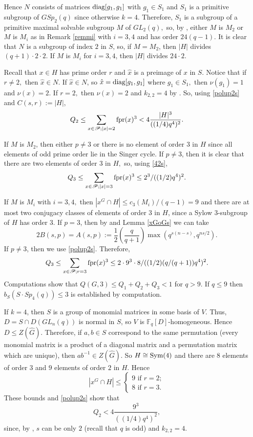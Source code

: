 Hence $N$ consists of matrices $\mathrm{diag}[g_1,g_1]$ with $g_1 \in S_1$ and $S_1$ is a primitive subgroup of $GSp_2(q)$ since otherwise $k=4.$ Therefore, $S_1$ is a subgroup of a primitive maximal solvable subgroup $M$ of $GL_2(q),$ so, by \cite[Chapter 5]{short}, either $M$ is $M_2$ or $M$ is  $M_i$ as in Remark \ref{remmi} with $i=3,4$  and has order $24(q-1).$ It is clear that $N$ is a subgroup of index $2$ in $S$, so, if $M=M_2$, then  $|H|$ divides $(q+1) \cdot 2 \cdot 2$. If $M$ is $M_i$ for $i=3,4$, then $|H|$ divides $24 \cdot 2$.

 Recall that $x \in H$ has prime order $r$ and $\hat{x}$ is a preimage of $x$ in $S$. Notice that if $r\ne 2,$ then $\hat{x} \in N.$ If $\hat{x} \in N$, so $\hat{x}=\mathrm{diag}[g_1,g_1]$ where $g_1 \in S_1,$ then $\nu(g_1)=1$ and $\nu(x)=2.$  If $r=2,$ then $\nu(x)=2$ and $k_{2,2}=4$ by \cite[Table 3.8]{fpr2}. 
So, using \eqref{polup2s} and $C(s,r) := |H|$,%
$$
Q_2  \le \sum_{{x} \in \mathscr{P}; |x|=2}{\mathrm{fpr}}({x})^3
<   4\frac{|H|^3}{((1/4)q^4)^2}. 
$$


If $M$ is $M_2$, then either $p\ne 3$ or there is no element of order $3$ in $H$ since all elements of odd prime order lie in the Singer cycle. If $p \ne 3$, then it is clear that there are two elements of order $3$ in $H,$ so, using \eqref{42s},%
 $$Q_{3}  \le \sum_{{x} \in \mathscr{P}; |x|=3}{\mathrm{fpr}}({x})^3  \le 2^3/((1/2)q^4)^2.$$

If $M$ is $M_i$ with $i=3,4,$ then $|x^G \cap H|\le c_3(M_i)/(q-1)=9$ and there are at most two conjugacy classes of elements of order $3$ in $H$, since a Sylow $3$-subgroup of $H$ has order $3.$  If $p=3$, then by \cite[Proposition 3.22]{fpr2} and Lemma \ref{xGoGs} we can take
\begin{equation}\label{ptri}
2B(s,p)=A(s,p):=\frac{1}{2}\left(\frac{q}{q+1} \right) \max(q^{s(n-s)},q^{ns/2}).
\end{equation} If $p\ne 3$, then we use \eqref{polup2s}. Therefore,
  $$Q_{3}  \le \sum_{{x} \in \mathscr{P}; r=3}{\mathrm{fpr}}({x})^3 \le 2 \cdot 9^3 \cdot 8/((1/2)(q/(q+1))q^4)^2.$$ 
Computations show that $Q(G,3)\le Q_1+Q_2+Q_3 <1$ for $q>9.$ If $q \le 9$ then  $b_S(S \cdot Sp_4(q)) \le 3$ is established by computation. 

If $k=4$, then  $S$ is a group of monomial matrices in some basis of $V.$ Thus, $D=S \cap D(GL_n(q))$ is normal in $S$, so $V$  is $\mathbb{F}_q[D]$-homogeneous. Hence $D \le Z(\hat{G}).$ Therefore, if $a,b \in S$ correspond to the same permutation (every monomial matrix is a product of a diagonal matrix and a permutation matrix which are unique), then $ab^{-1} \in Z(\hat{G}).$ So $H \cong \mathrm{Sym}(4)$ and there are $8$ elements of order $3$ and $9$ elements of order $2$ in $H.$ Hence $$|x^G \cap H| \le 
\begin{cases}
 9 \text{ if } r=2;\\
8 \text{ if } r=3.
\end{cases}
$$   
These bounds and \eqref{polup2s} show that
$$
Q_2 
<   4\frac{9^3}{((1/4)q^4)^2},
$$ since, by \cite[Table 3.8]{fpr2}, $s$ can be only  $2$ (recall that $q$ is odd) and $k_{2,2}=4.$ 

